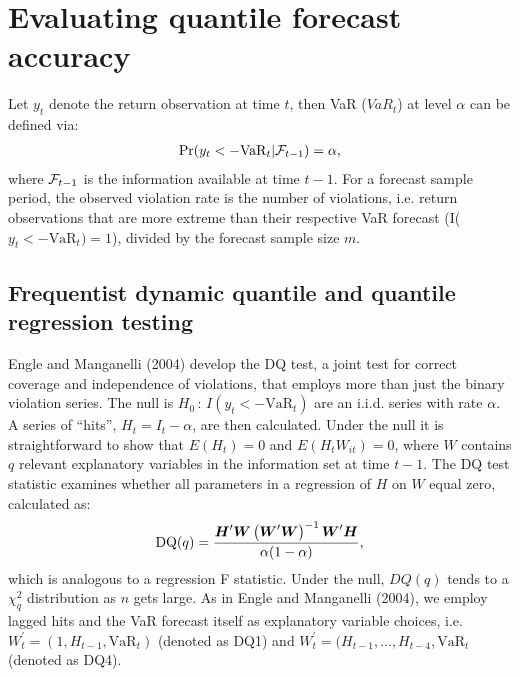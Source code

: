 \documentclass[12pt,epsf]{article}
\newcommand{\utwi}[1]{\mbox{\boldmath $ #1$}}
\newcommand{\calF}{{\cal F}}
\begin{document}
\section{Evaluating quantile forecast accuracy}
Let $y_t$ denote the return observation at time $t$, then VaR ($VaR_t$) at level $\alpha$ can be defined via:
\begin{eqnarray*}
\textrm{Pr}(y_t < -\mbox{VaR}_t|\calF_{t-1}) = \alpha,
\end{eqnarray*}
where $\calF_{t-1}$ is the information available at time $t-1$. For a forecast sample period, the
observed violation rate is the number of violations, i.e. return observations that are more extreme than their
respective VaR forecast (I($y_{t}< -\mbox{VaR}_{t})=1$), divided by the forecast sample size $m$.

\subsection{Frequentist dynamic quantile and quantile regression testing}
Engle and Manganelli (2004) develop the DQ test, a joint test for correct coverage and independence of violations, that employs more
than just the binary violation series. The null is $ H_{0} \,:\, I(y_{t}< -\mbox{VaR}_{t})$ are an i.i.d. series with rate $\alpha$.
A series of ``hits'', $H_t = I_{t}-\alpha$, are then calculated. Under the null it is
straightforward to show that $E(H_t) = 0$ and $E(H_tW_{it})=0$, where $W$ contains $q$ relevant explanatory variables in the information
set at time $t-1$. The DQ test statistic examines whether all parameters in a regression of $H$ on $W$ equal zero, calculated as:
\begin{eqnarray*}
\mbox{DQ}(q) = \frac{\utwi{H}'\utwi{W}\left(\utwi{W}'\utwi{W}\right)^{-1}\utwi{W}'\utwi{H}}{\alpha(1-\alpha)},
\end{eqnarray*}
which is analogous to a regression F statistic. Under the null, $DQ(q)$ tends to a $\chi^2_q$ distribution as $n$ gets large.
As in Engle and Manganelli (2004), we employ lagged hits and the VaR forecast itself as explanatory variable choices,
i.e. $W_t^{'} = (1, H_{t-1}, \mbox{VaR}_{t})$ (denoted as DQ1) and $W_t^{'} = (H_{t-1}, \ldots, H_{t-4}, \mbox{VaR}_{t}$ (denoted as DQ4).
\end{document}
